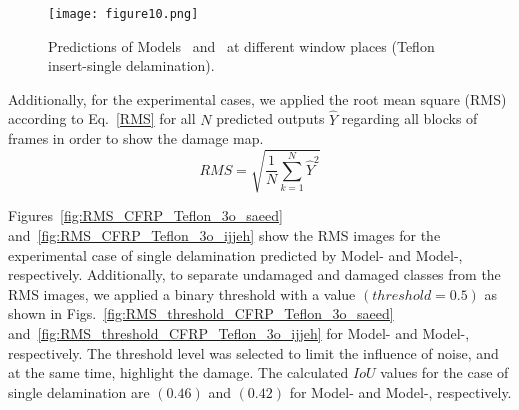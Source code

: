 \begin{figure}[!h]
	\centering
	\texttt{[image: figure10.png]}
	\caption{Predictions of Models~ and~ at different window places (Teflon insert-single delamination).}
	\label{fig:CFRP_Teflon_3o_predictions}
\end{figure}

Additionally, for the experimental cases, we applied the root mean square (RMS) according to Eq.~\ref{RMS} for all \(N\) predicted outputs \(\hat{Y}\) regarding all blocks of frames in order to show the damage map.
\begin{equation}
	RMS = \sqrt{\frac{1}{N}\sum_{k=1}^{N}\hat{Y}^2}	
	\label{RMS}
\end{equation}

Figures~\ref{fig:RMS_CFRP_Teflon_3o_saeed} and~\ref{fig:RMS_CFRP_Teflon_3o_ijjeh} show the RMS images for the experimental case of single delamination predicted by Model- and Model-, respectively.
Additionally, to separate undamaged and damaged classes from the RMS images, we applied a binary threshold with a value \((threshold=0.5)\) as shown in Figs.~\ref{fig:RMS_threshold_CFRP_Teflon_3o_saeed} and~\ref{fig:RMS_threshold_CFRP_Teflon_3o_ijjeh} for Model- and Model-, respectively. 
The threshold level was selected to limit the influence of noise, and at the same time, highlight the damage.
The calculated \(IoU\) values for the case of single delamination are \((0.46)\) and \((0.42)\) for Model- and Model-, respectively.

